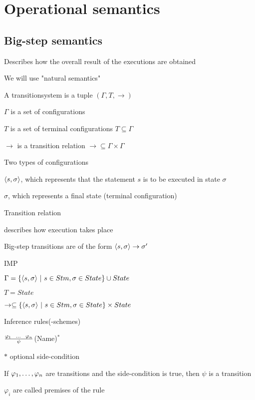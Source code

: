 \section{Operational semantics}

\subsection{Big-step semantics}
\enumstart
	\item Describes how the overall result of the executions are obtained
	\item We will use "natural semantics"
	\item A transitionsystem is a tuple $(\Gamma, T, \rightarrow)$
	\enumstart
		\item $\Gamma$ is a set of configurations
		\item $T$ is a set of terminal configurations $T \subseteq \Gamma$
		\item $\rightarrow$ is a transition relation $\rightarrow \subseteq \Gamma \times \Gamma$
	\enumend
	\item Two types of configurations
	\enumstart
		\item $\langle s, \sigma \rangle$, which represents that the statement $s$ is to be executed in state $\sigma$
		\item $\sigma$, which represents a final state (terminal configuration)
	\enumend
	\item Transition relation
	\enumstart
		\item describes how execution takes place
		\item Big-step transitions are of the form $\langle s, \sigma \rangle \rightarrow \sigma'$
	\enumend
	\item IMP
	\enumstart
		\item $\Gamma = \{ \langle s, \sigma \rangle \ | \ s \in Stm, \sigma \in State\} \cup State $
		\item $T = State$
		\item $\rightarrow \subseteq \{ \langle s, \sigma \rangle \ | \ s \in Stm, \sigma \in State\} \times State$
	\enumend
	\item Inference rules(-schemes)
	\enumstart
		\item $\frac{\varphi_1 \ \ \mathellipsis \ \ \varphi_n}{\psi}$(Name)$^*$
		\item $*$ optional side-condition
		\item If $\varphi_1, \mathellipsis, \varphi_n$ are transitions and the side-condition is true, then $\psi$ is a transition
		\item $\varphi_i$ are called premises of the rule
